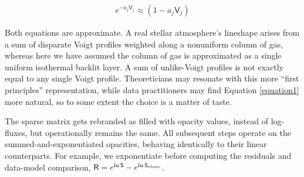 \documentclass[twocolumn]{aastex631}
\begin{document}
\begin{eqnarray}
    e^{-a_j \mathsf{V}_j} \approx (1-a_j\mathsf{V}_j) \label{eqnTaylor}
\end{eqnarray}

Both equations are approximate. A real stellar atmosphere's lineshape arises from a sum of disparate Voigt profiles weighted along a nonuniform column of gas, whereas here we have assumed the column of gas is approximated as a single uniform isothermal backlit layer.  A sum of unlike-Voigt profiles is not exactly equal to any single Voigt profile.  Theoreticians may resonate with this more ``first principles'' representation, while data practitioners may find Equation \ref{equation1} more natural, so to some extent the choice is a matter of taste.

The sparse matrix gets rebranded as filled with opacity values, instead of log-fluxes, but operationally remains the same. All subsequent steps operate on the summed-and-exponentiated opacities, behaving identically to their linear counterparts.  For example, we exponentiate before computing the residuals and data-model comparison, $\mathsf{R} = e^{\ln{\mathsf{S}}} - e^{\ln{\mathsf{S}_{\rm clone}}}$.
\end{document}
